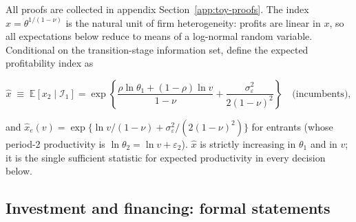 \documentclass[12pt]{article}
\begin{document}
All proofs are collected in appendix Section~\ref{app:toy-proofs}. The index $x=\theta^{1/(1-\nu)}$ is the natural unit of firm heterogeneity: profits are linear in $x$, so all expectations below reduce to means of a log-normal random variable. Conditional on the transition-stage information set, define the expected profitability index as

\begin{equation}
  \hat x \;\equiv\; \mathbb{E} \!\left[x_{2}\mid \mathcal{I}_{1}\right]
  = \exp\!\left\{\frac{\rho\ln\theta_{1}+(1-\rho)\ln v}{1-\nu}
    + \frac{\sigma_{\varepsilon}^{2}}{2(1-\nu)^{2}}\right\}
  \quad\text{(incumbents)},
  \label{eq:toy-xhat}
\end{equation}


and $\hat x_{e}(v)=\exp\{\ln v/(1-\nu) +\sigma_{\varepsilon}^{2}/(2(1-\nu)^{2})\}$ for entrants (whose period-2 productivity is $\ln\theta_{2}=\ln v+\varepsilon_{2}$). $\hat x$ is strictly increasing in $\theta_{1}$ and in $v$; it is the single sufficient statistic for expected productivity in every decision below.

\subsection{Investment and financing: formal statements}
\end{document}
